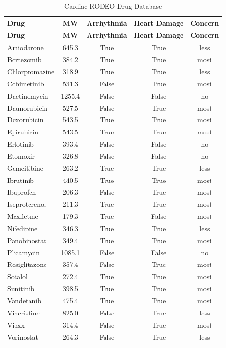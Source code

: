 \documentclass[11pt]{article}
\begin{document}
\begin{longtable}{lcccc}
\caption{Cardiac RODEO Drug Database} \\
\toprule
\textbf{Drug} & \textbf{MW} & \textbf{Arrhythmia} & \textbf{Heart Damage} & \textbf{Concern} \\
\midrule
\endfirsthead
\toprule
\textbf{Drug} & \textbf{MW} & \textbf{Arrhythmia} & \textbf{Heart Damage} & \textbf{Concern} \\
\midrule
\endhead
Amiodarone & 645.3 & True & True & less \\
Bortezomib & 384.2 & True & True & most \\
Chlorpromazine & 318.9 & True & True & less \\
Cobimetinib & 531.3 & False & True & most \\
Dactinomycin & 1255.4 & False & False & no \\
Daunorubicin & 527.5 & False & True & most \\
Doxorubicin & 543.5 & True & True & most \\
Epirubicin & 543.5 & True & True & most \\
Erlotinib & 393.4 & False & False & no \\
Etomoxir & 326.8 & False & False & no \\
Gemcitibine & 263.2 & True & True & less \\
Ibrutinib & 440.5 & True & True & most \\
Ibuprofen & 206.3 & False & True & most \\
Isoproterenol & 211.3 & True & True & most \\
Mexiletine & 179.3 & True & False & most \\
Nifedipine & 346.3 & True & True & less \\
Panobinostat & 349.4 & True & True & most \\
Plicamycin & 1085.1 & False & False & no \\
Rosiglitazone & 357.4 & False & True & most \\
Sotalol & 272.4 & True & True & most \\
Sunitinib & 398.5 & True & True & most \\
Vandetanib & 475.4 & True & True & most \\
Vincristine & 825.0 & False & True & less \\
Vioxx & 314.4 & False & True & most \\
Vorinostat & 264.3 & False & True & less \\
\bottomrule
\end{longtable}
\end{document}
